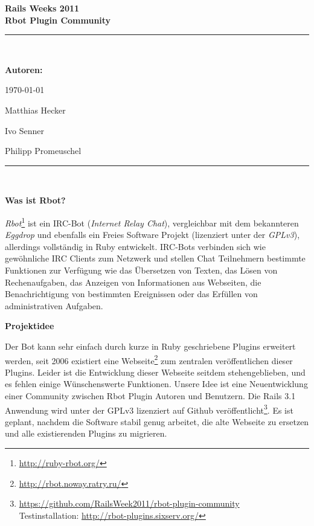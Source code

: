 \documentclass[pdftex,11pt,a4paper,notitlepage]{report}
\author{Matthias Hecker}
\newcommand{\HRule}{\rule{\linewidth}{0.5mm}}
\begin{document}
\begin{center}
{ \large \bfseries Rails Weeks 2011}\\[0.4cm]
{ \huge \bfseries Rbot Plugin Community}\\[0.1cm]
\HRule \\[0.0cm]
\end{center}

\begin{flushleft}

\textbf{Autoren:}\hfill\parbox[t]{0.7\textwidth}{\raggedleft \today}

Matthias Hecker

Ivo Senner

Philipp Promeuschel\\[0.3cm]

\HRule \\[0.5cm]

\end{flushleft}

\begin{flushleft}
\textbf{Was ist Rbot?}
\end{flushleft}

\textit{Rbot}\footnote{\url{http://ruby-rbot.org/}} ist ein IRC-Bot (\textit{Internet Relay Chat}), 
vergleichbar mit dem bekannteren
\textit{Eggdrop} und ebenfalls ein Freies Software Projekt (lizenziert unter der
\textit{GPLv3}), allerdings vollständig in Ruby entwickelt. IRC-Bots verbinden sich
wie gewöhnliche IRC Clients zum Netzwerk und stellen Chat Teilnehmern
bestimmte Funktionen zur Verfügung wie das Übersetzen von Texten, das Lösen
von Rechenaufgaben, das Anzeigen von Informationen aus Webseiten, die Benachrichtigung
von bestimmten Ereignissen oder das Erfüllen von administrativen Aufgaben.

\begin{flushleft}
\textbf{Projektidee}
\end{flushleft}

Der Bot kann sehr einfach durch kurze in Ruby geschriebene Plugins erweitert werden,
seit 2006 existiert eine Webseite\footnote{\url{http://rbot.noway.ratry.ru/}} zum zentralen 
veröffentlichen dieser Plugins.
Leider ist die Entwicklung dieser Webseite seitdem stehengeblieben, und es fehlen
einige Wünschenswerte Funktionen. Unsere Idee ist eine Neuentwicklung einer Community 
zwischen Rbot Plugin Autoren und Benutzern. Die Rails 3.1 Anwendung wird
unter der GPLv3 lizenziert auf Github 
veröffentlicht\footnote{\url{https://github.com/RailsWeek2011/rbot-plugin-community}\\
    Testinstallation: \url{http://rbot-plugins.sixserv.org/}}. 
Es ist geplant,
nachdem die Software stabil genug arbeitet, die alte Webseite zu ersetzen und alle
existierenden Plugins zu migrieren.
\end{document}
